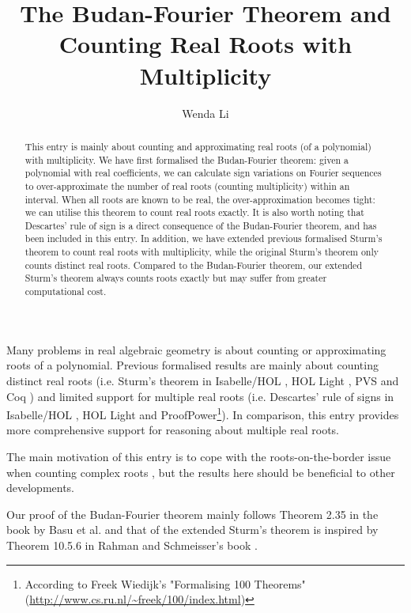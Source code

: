 \documentclass[11pt,a4paper]{article}
\begin{document}
\title{The Budan-Fourier Theorem and Counting Real Roots with Multiplicity}
\author{Wenda Li}
\maketitle

\begin{abstract}
	This entry is mainly about counting and approximating real roots (of a polynomial) with multiplicity.
	We have first formalised the Budan-Fourier theorem: given a polynomial with real coefficients, we can calculate sign variations on Fourier sequences to over-approximate the number of real roots (counting multiplicity) within an interval. When all roots are known to be real, the over-approximation becomes tight: we can utilise this theorem to count real roots exactly. It is also worth noting that Descartes' rule of sign is a direct consequence of the Budan-Fourier theorem, and has been included in this entry. In addition, we have extended previous formalised Sturm's theorem to count real roots with multiplicity, while the original Sturm's theorem only counts distinct real roots. Compared to the Budan-Fourier theorem, our extended Sturm's theorem always counts roots exactly but may suffer from greater computational cost.
\end{abstract}

Many problems in real algebraic geometry is about counting or approximating roots of a polynomial. Previous formalised results are mainly about counting distinct real roots (i.e. Sturm's theorem in Isabelle/HOL \cite{Sturm_Tarski-AFP,Sturm_Sequences-AFP}, HOL Light \cite{harrison-poly}, PVS \cite{Narkawicz:2015do} and Coq \cite{Mahboubi:2012gg}) and limited support for multiple real roots (i.e. Descartes' rule of signs in Isabelle/HOL \cite{Descartes_Sign_Rule-AFP}, HOL Light and ProofPower\footnote{According to Freek Wiedijk's "Formalising 100 Theorems" (\url{http://www.cs.ru.nl/~freek/100/index.html})}). In comparison, this entry provides more comprehensive support for reasoning about multiple real roots.

The main motivation of this entry is to cope with the roots-on-the-border issue when counting complex roots \cite{li_evaluate_cauchy,Count_Complex_Roots-AFP}, but the results here should be beneficial to other developments.

Our proof of the Budan-Fourier theorem mainly follows Theorem 2.35 in the book by Basu et al. \cite{Basu:2006bo} and that of the extended Sturm's theorem is inspired by Theorem 10.5.6 in Rahman and Schmeisser's book \cite{Rahman:2016us}.






\end{document}
